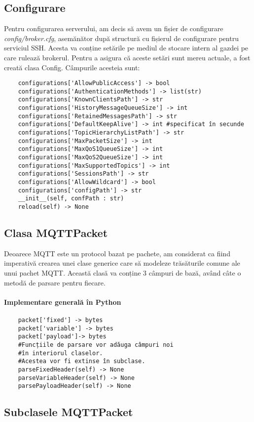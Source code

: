\documentclass{report}
\begin{document}
\subsection{Configurare}
Pentru configurarea serverului, am decis să avem un fișier de configurare \emph{config/broker.cfg}, asemănător după structură cu fișierul de configurare pentru serviciul SSH. Acesta va conține setările pe mediul de stocare intern al gazdei pe care rulează brokerul. Pentru a asigura că aceste setări sunt mereu actuale, a fost creată clasa Config.
Câmpurile acesteia sunt:
\begin{verbatim}
	configurations['AllowPublicAccess'] -> bool
	configurations['AuthenticationMethods'] -> list(str)
	configurations['KnownClientsPath'] -> str
	configurations['HistoryMessageQueueSize'] -> int
	configurations['RetainedMessagesPath'] -> str
	configurations['DefaultKeepAlive'] -> int #specificat în secunde
	configurations['TopicHierarchyListPath'] -> str
	configurations['MaxPacketSize'] -> int
	configurations['MaxQoS1QueueSize'] -> int
	configurations['MaxQoS2QueueSize'] -> int
	configurations['MaxSupportedTopics'] -> int
	configurations['SessionsPath'] -> str
	configurations['AllowWildcard'] -> bool
	configurations['configPath'] -> str
	__init__(self, confPath : str)
	reload(self) -> None	
\end{verbatim}
\subsection{Clasa MQTTPacket}
Deoarece MQTT este un protocol bazat pe pachete, am considerat ca fiind imperativă crearea unei clase generice care să modeleze trăsăturile comune ale unui pachet MQTT.
Această clasă va conține 3 câmpuri de bază, având câte o metodă de parsare pentru fiecare.
\paragraph{Implementare generală în Python}
\begin{verbatim}
	packet['fixed'] -> bytes
	packet['variable'] -> bytes
	packet['payload']-> bytes
	#Funcțiile de parsare vor adăuga câmpuri noi
	#în interiorul claselor.
	#Acestea vor fi extinse în subclase.
	parseFixedHeader(self) -> None 
	parseVariableHeader(self) -> None
	parsePayloadHeader(self) -> None
\end{verbatim}
\subsection{Subclasele MQTTPacket}
\end{document}
